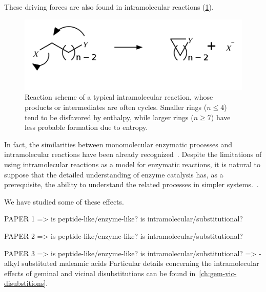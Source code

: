 These driving forces are also found in intramolecular reactions (\cref{fig:reacoes-intramoleculares}).
%
\begin{figure}[hbtp]
    \centering
    \includegraphics[width=.6\textwidth]{figures/reacao-intramolecular}
    \caption[Typical scheme of an intramolecular reactions]{
        Reaction scheme of a typical intramolecular reaction, whose products or
        intermediates are often cycles.
        Smaller rings ($n \le 4 $)
        tend to be disfavored by enthalpy, while larger rings ($n \ge 7 $)
        have less probable formation due to entropy.}%
    \label{fig:reacoes-intramoleculares}
\end{figure}
%
In fact, the similarities between monomolecular enzymatic processes and
intramolecular reactions have been already recognized~\cite{Nilsson_1933,Bruice_1960b,Jung_1990}.
Despite the limitations of using intramolecular reactions as a model for
enzymatic reactions, it is natural to suppose that the detailed understanding
of enzyme catalysis has, as a prerequisite, the ability to understand the
related processes in simpler systems.~\cite{Kirby_1972}.

We have studied some of these effects.

PAPER 1 => is peptide-like/enzyme-like? is intramolecular/substitutional?

PAPER 2 => is peptide-like/enzyme-like? is intramolecular/substitutional?

PAPER 3 => is peptide-like/enzyme-like? is intramolecular/substitutional?
=> \emph{}-alkyl substituted maleamic acids
Particular details concerning the intramolecular effects of geminal and
vicinal disubstitutions can be found in~\cref{ch:gem-vic-disubstitions}.
